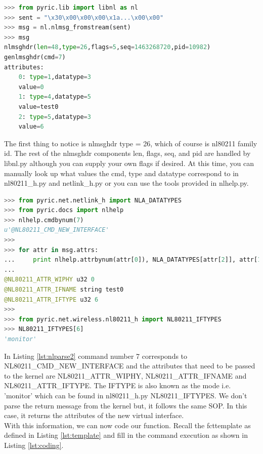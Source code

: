 \documentclass[11pt]{article}
\begin{document}
\begin{lstlisting}[caption={Parsing netlink messages},
                   label={lst:nlparse},
                   language=Python]
>>> from pyric.lib import libnl as nl
>>> sent = "\x30\x00\x00\x00\x1a...\x00\x00"
>>> msg = nl.nlmsg_fromstream(sent)
>>> msg
nlmsghdr(len=48,type=26,flags=5,seq=1463268720,pid=10982)
genlmsghdr(cmd=7)
attributes:
	0: type=1,datatype=3
	value=0
	1: type=4,datatype=5
	value=test0
	2: type=5,datatype=3
	value=6
\end{lstlisting}

The first thing to notice is nlmsghdr type = 26, which of course is nl80211 family
id. The rest of the nlmsghdr components len, flags, seq, and pid are handled by
libnl.py although you can supply your own flags if desired. At this time, you can
manually look up what values the cmd, type and datatype correspond to in 
nl80211\_h.py and netlink\_h.py or you can use the tools provided in nlhelp.py.\\

\begin{lstlisting}[caption={Parsing netlink messages continued},
                   label={lst:nlparse2},
                   language=Python]
>>> from pyric.net.netlink_h import NLA_DATATYPES
>>> from pyric.docs import nlhelp
>>> nlhelp.cmdbynum(7)
u'@NL80211_CMD_NEW_INTERFACE'
>>>
>>> for attr in msg.attrs:
...     print nlhelp.attrbynum(attr[0]), NLA_DATATYPES[attr[2]], attr[1]
... 
@NL80211_ATTR_WIPHY u32 0
@NL80211_ATTR_IFNAME string test0
@NL80211_ATTR_IFTYPE u32 6
>>>
>>> from pyric.net.wireless.nl80211_h import NL80211_IFTYPES
>>> NL80211_IFTYPES[6]
'monitor'
\end{lstlisting}

In Listing \ref{lst:nlparse2} command number 7 corresponds to 
NL80211\_CMD\_NEW\_INTERFACE and the attributes that need to be passed to the
kernel are NL80211\_ATTR\_WIPHY, NL80211\_ATTR\_IFNAME and NL80211\_ATTR\_IFTYPE.
The IFTYPE is also known as the mode i.e. 'monitor' which can be found in
nl80211\_h.py NL80211\_IFTYPES. We don't parse the return message from the kernel
but, it follows the same SOP. In this case, it returns the attributes of the new
virtual interface. \\

With this information, we can now code our function. Recall the fcttemplate as
defined in Listing \ref{lst:template} and fill in the command execution as shown 
in Listing \ref{lst:coding}. \\
\end{document}
